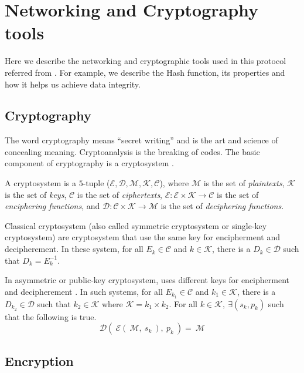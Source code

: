 \chapter{Networking and Cryptography tools} %
\label{cha:Networking and Cryptography tools}
	Here we describe the networking and cryptographic tools used in this protocol referred from \cite{menezes2010handbook,stinson2005cryptography}.
	For example, we describe the Hash function, its properties and how it helps us achieve data integrity.

\section{Cryptography}
	The word cryptography means ``secret writing'' and is the art and science of concealing meaning.
	Cryptoanalysis is the breaking of codes.
	The basic component of cryptography is a cryptosystem \cite{bishop2004introduction}.
	\begin{definition}
		A cryptosystem is a $5$-tuple ($ \mathcal{E,D,M,K,C}$), where $\mathcal{M}$ is the set of \textit{plaintexts}, $\mathcal{K}$ is the set of \textit{keys}, $\mathcal{C}$ is the set of \textit{ciphertexts}, $\mathcal{E}:\mathcal{E} \times \mathcal{K} \rightarrow \mathcal{C}$ is the set of \textit{enciphering functions}, and $\mathcal{D}:\mathcal{C} \times \mathcal{K} \rightarrow \mathcal{M}$ is the set of \textit{deciphering functions}.
	\end{definition}

	Classical cryptosystem (also called symmetric cryptosystem or single-key cryptosystem) are cryptosystem that use the same key for encipherment and decipherement.
	In these system, for all $E_{k} \in \mathcal{C}$ and $k \in \mathcal{K}$, there is a $D_{k} \in \mathcal{D}$ such that $D_{k} = E_{k}^{-1}$.

	In asymmetric or public-key cryptosystem, uses different keys for encipherment and decipherement .
	In such systems, for all $E_{k_{1}} \in \mathcal{C}$ and $k_{1} \in \mathcal{K}$, there is a $D_{k_{2}} \in \mathcal{D}$ such that $k_{2} \in \mathcal{K}$ where $\mathcal{K} = k_{1} \times k_{2}$.
	For all $k \in \mathcal{K},\  \exists (s_{k},p_{k})$ such that the following is true.
	\begin{equation}
		\mathcal{D}(\ \mathcal{E}(\ \mathcal{M},\ s_{k}\ ),\ p_{k}\ ) =\ \mathcal{M}
	\end{equation}

\section{Encryption}

